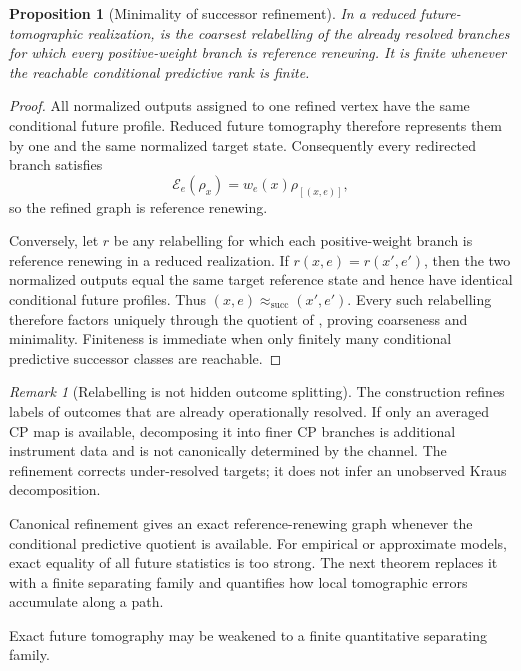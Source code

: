\documentclass[11pt]{article}
\newtheorem{proposition}[theorem]{Proposition}
\theoremstyle{definition}
\theoremstyle{remark}
\newtheorem{remark}[theorem]{Remark}
\newcommand{\E}{\mathcal E}
\begin{document}
\begin{proposition}[Minimality of successor refinement]
\label{prop:successor-refinement}
In a reduced future-tomographic realization,
 is the coarsest relabelling of the already
resolved branches for which every positive-weight branch is reference renewing.
It is finite whenever the reachable conditional predictive rank is finite.
\end{proposition}

\begin{proof}
All normalized outputs assigned to one refined vertex have the same conditional
future profile.  Reduced future tomography therefore represents them by one and
the same normalized target state.  Consequently every redirected branch
satisfies
\[
 \E_e(\rho_x)=w_e(x)\rho_{[(x,e)]},
\]
so the refined graph is reference renewing.

Conversely, let $r$ be any relabelling for which each positive-weight branch is
reference renewing in a reduced realization.  If
$r(x,e)=r(x',e')$, then the two normalized outputs equal the same target
reference state and hence have identical conditional future profiles.  Thus
$(x,e)\approx_{\mathrm{succ}}(x',e')$.  Every such relabelling therefore factors
uniquely through the quotient of
, proving coarseness and minimality.  Finiteness
is immediate when only finitely many conditional predictive successor classes
are reachable.
\end{proof}

\begin{remark}[Relabelling is not hidden outcome splitting]
\label{rem:refinement-not-splitting}
The construction refines labels of outcomes that are already operationally
resolved.  If only an averaged CP map is available, decomposing it into finer CP
branches is additional instrument data and is not canonically determined by the
channel.  The refinement corrects under-resolved targets; it does not infer an
unobserved Kraus decomposition.
\end{remark}

Canonical refinement gives an exact reference-renewing graph whenever the
conditional predictive quotient is available.  For empirical or approximate
models, exact equality of all future statistics is too strong.  The next theorem
replaces it with a finite separating family and quantifies how local tomographic
errors accumulate along a path.

Exact future tomography may be weakened to a finite quantitative separating
family.
\end{document}
